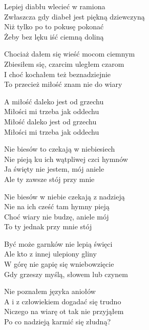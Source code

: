 \begin{text}
Lepiej diabłu wlecieć w ramiona\\
Zwłaszcza gdy diabeł jest piękną dziewczyną\\
Niż tylko po to pokusę pokonać\\
Żeby bez lęku iść ciemną doliną

Chociaż dałem się wieść mocom ciemnym\\
Zbiesiłem się, czarcim uległem czarom\\
I choć kochałem też beznadziejnie\\
To przecież miłość znam nie do wiary

\vin A miłość daleko jest od grzechu\\
\vin Miłości mi trzeba jak oddechu\\
\vin Miłość daleko jest od grzechu\\
\vin Miłości mi trzeba jak oddechu

\vin Nie biesów to czekają w niebiesiech\\
\vin Nie pieją ku ich wątpliwej czci hymnów\\
\vin Ja święty nie jestem, mój aniele\\
\vin Ale ty zawsze stój przy mnie

\vin Nie biesów w niebie czekają z nadzieją\\
\vin Nie na ich cześć tam hymny pieją\\
\vin Choć wiary nie budzę, aniele mój\\
\vin To ty jednak przy mnie stój

Być może garnków nie lepią święci\\
Ale kto z innej ulepiony gliny\\
W górę nie gapię się wniebowzięcie\\
Gdy grzeszy myślą, słowem lub czynem

Nie poznałem języka aniołów\\
A i z człowiekiem dogadać się trudno\\
Niczego na wiarę ot tak nie przyjąłem\\
Po co nadzieją karmić się złudną?
\end{text}

